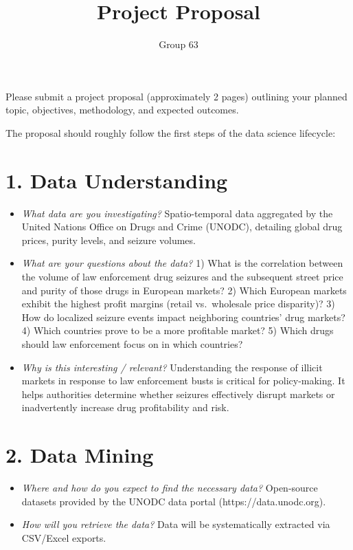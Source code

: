 \documentclass[a4paper,12pt]{article}
\title{%
    \textbf{Project Proposal}
}
\author{ Group 63}
\date{}
\begin{document}

\maketitle
\thispagestyle{empty}

\noindent
Please submit a project proposal (approximately 2 pages) outlining your
planned topic, objectives, methodology, and expected outcomes.

\noindent
The proposal should roughly follow the first steps of the data science
lifecycle:

\section{1. Data Understanding}
\begin{itemize}[leftmargin=1.5em]
    \item \textit{What data are you investigating?} 
          Spatio-temporal data aggregated by the United Nations Office on Drugs and Crime (UNODC), detailing global drug prices, purity levels, and seizure volumes.
          
    \item \textit{What are your questions about the data?} 
          1) What is the correlation between the volume of law enforcement drug seizures and the subsequent street price and purity of those drugs in European markets? 
          2) Which European markets exhibit the highest profit margins (retail vs.\ wholesale price disparity)? 
          3) How do localized seizure events impact neighboring countries' drug markets?
          4) Which countries prove to be a more profitable market?
          5) Which drugs should law enforcement focus on in which countries?

    \item \textit{Why is this interesting / relevant?}
          Understanding the response of illicit markets in response to law enforcement busts is critical for policy-making. It helps authorities determine whether seizures effectively disrupt markets or inadvertently increase drug profitability and risk.
\end{itemize}

\section{2. Data Mining}
\begin{itemize}[leftmargin=1.5em]
    \item \textit{Where and how do you expect to find the necessary data?}
          Open-source datasets provided by the UNODC data portal (https://data.unodc.org).

    \item \textit{How will you retrieve the data?}
          Data will be systematically extracted via CSV/Excel exports.
\end{itemize}
\end{document}

